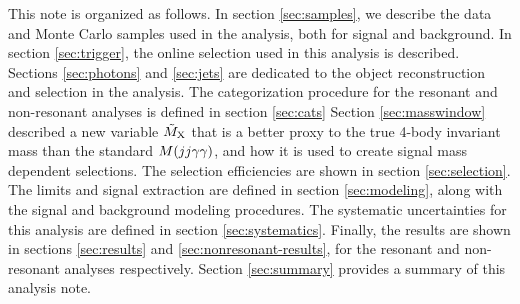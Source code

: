 
This note is organized as follows.
In section \ref{sec:samples}, we describe the data and Monte Carlo samples used in the analysis, both for signal and background.
In section \ref{sec:trigger}, the online selection used in this analysis is described.
Sections \ref{sec:photons} and \ref{sec:jets} are dedicated to the object reconstruction and selection in the analysis.
The categorization procedure for the resonant and non-resonant analyses is defined in section \ref{sec:cats}
Section \ref{sec:masswindow} described a new variable $\tilde{M}_{\mathrm{X}}$ that is a better proxy to the true 4-body invariant mass than the standard $M(jj\gamma\gamma)$, and how it is used to create signal mass dependent selections.
The selection efficiencies are shown in section \ref{sec:selection}.
The limits and signal extraction are defined in section \ref{sec:modeling}, along with the signal and background modeling procedures.
The systematic uncertainties for this analysis are defined in section \ref{sec:systematics}.
Finally, the results are shown in sections \ref{sec:results} and \ref{sec:nonresonant-results}, for the resonant and non-resonant analyses respectively.
Section \ref{sec:summary} provides a summary of this analysis note.

